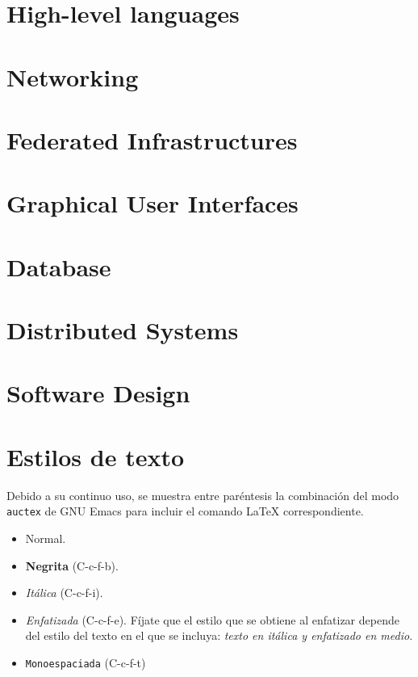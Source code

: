 \section{High-level languages}

\section{Networking}
\section{Federated Infrastructures}
\section{Graphical User Interfaces}

\section{Database}

\section{Distributed Systems}

\section{Software Design}


\section{Estilos de texto}

Debido a su continuo uso, se muestra entre paréntesis la combinación del modo
\texttt{auctex} de GNU Emacs para incluir el comando \LaTeX{} correspondiente.

\begin{itemize}
\item Normal.
\item \textbf{Negrita} (C-c-f-b).
\item \textit{Itálica} (C-c-f-i).
\item \emph{Enfatizada} (C-c-f-e). Fíjate que el estilo que se obtiene al
  enfatizar depende del estilo del texto en el que se incluya: \textit{texto en
    itálica y \emph{enfatizado} en medio}.
\item \texttt{Monoespaciada} (C-c-f-t)
\end{itemize}

